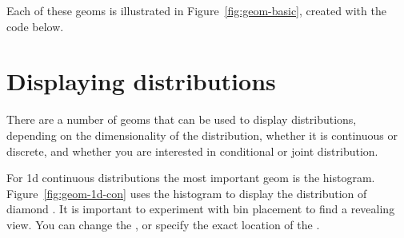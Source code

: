 \noindent Each of these geoms is illustrated in Figure~\ref{fig:geom-basic}, created with the code below.

% 


\section{Displaying distributions}\label{sec:distributions}

There are a number of geoms that can be used to display distributions, depending on the dimensionality of the distribution, whether it is continuous or discrete, and whether you are interested in conditional or joint distribution.

For 1d continuous distributions the most important geom is the histogram.  Figure~\ref{fig:geom-1d-con} uses the histogram to display the distribution of diamond .  It is important to experiment with bin placement to find a revealing view. You can change the , or specify the exact location of the .  

% 


